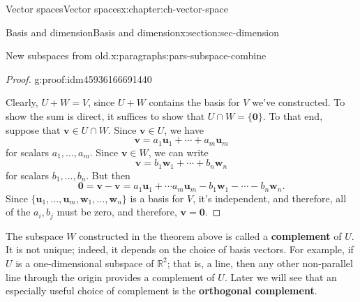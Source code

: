 \documentclass[oneside,10pt,]{book}
\newcommand{\terminology}[1]{\textbf{#1}}
\numberwithin{equation}{section}
\newcommand{\R}{\mathbb{R}}
\newcommand{\uu}{\mathbf{u}}
\newcommand{\vv}{\mathbf{v}}
\newcommand{\ww}{\mathbf{w}}
\begin{document}
\begin{chapterptx}{Vector spaces}{}{Vector spaces}{}{}{x:chapter:ch-vector-space}
\begin{sectionptx}{Basis and dimension}{}{Basis and dimension}{}{}{x:section:sec-dimension}
\begin{paragraphs}{New subspaces from old.}{x:paragraphs:pars-subspace-combine}
\begin{proof}{}{g:proof:idm45936166691440}
\par
Clearly, \(U+W=V\), since \(U+W\) contains the basis for \(V\) we've constructed. To show the sum is direct, it suffices to show that \(U\cap W = \{\mathbf{0}\}\). To that end, suppose that \(\vv\in U\cap W\). Since \(\vv\in U\), we have%
\begin{equation*}
\vv=a_1\uu_1+\cdots +a_m\uu_m
\end{equation*}
for scalars \(a_1,\ldots, a_m\). Since \(\vv\in W\), we can write%
\begin{equation*}
\vv=b_1\ww_1+\cdots + b_n\ww_n
\end{equation*}
for scalars \(b_1,\ldots, b_n\). But then%
\begin{equation*}
\mathbf{0}=\vv-\vv=a_1\uu_1+\cdots a_m\uu_m-b_1\ww_1-\cdots -b_n\ww_n.
\end{equation*}
Since \(\{\uu_1,\ldots, \uu_m,\ww_1,\ldots, \ww_n\}\) is a basis for \(V\), it's independent, and therefore, all of the \(a_i,b_j\) must be zero, and therefore, \(\vv=\mathbf{0}\).%
\end{proof}
The subspace \(W\) constructed in the theorem above is called a \terminology{complement} of \(U\). It is not unique; indeed, it depends on the choice of basis vectors. For example, if \(U\) is a one-dimensional subspace of \(\R^2\); that is, a line, then any other non-parallel line through the origin provides a complement of \(U\). Later we will see that an especially useful choice of complement is the \terminology{orthogonal complement}.%
\end{paragraphs}%
\end{sectionptx}
\end{chapterptx}
%
%
\typeout{************************************************}
\typeout{************************************************}
%
\end{document}
